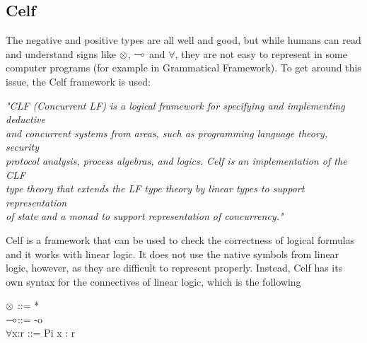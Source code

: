
\subsection{Celf}
\label{03_01_03}

The negative and positive types are all well and good, but while humans can read and understand signs like $\otimes$, $\multimap$ and $\forall$, they are not easy to represent in some computer programs (for example in Grammatical Framework). To get around this issue, the Celf framework is used:

\begin{texto}
	\textit{"CLF (Concurrent LF) is a logical framework for specifying and implementing deductive \\
	and concurrent systems from areas, such as programming language theory, security \\
	protocol analysis, process algebras, and logics. Celf is an implementation of the CLF \\
	type theory that extends the LF type theory by linear types to support representation \\
	of state and a monad to support representation of concurrency."} \cite{Celf}
\end{texto}

Celf is a framework that can be used to check the correctness of logical formulas and it works with linear logic. It does not use the native symbols from linear logic, however, as they are difficult to represent properly. Instead, Celf has its own syntax for the connectives of linear logic, which is the following

\begin{texto}
	$\otimes$\hspace{40pt} ::= * \\
	$\multimap$\hspace{40pt}::= -o \\
	$\forall$x:r\hspace{30pt} ::= Pi x : r \\
\end{texto}

